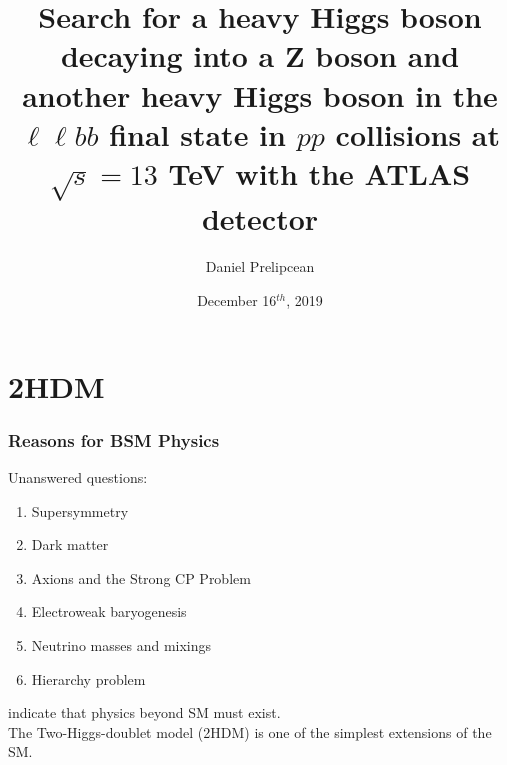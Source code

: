 \documentclass[10pt]{beamer} %
\title[Search for a heavy Higgs boson decay $A \to ZH \to  \ell\ell bb$ final state in $pp$ collisions at $\sqrt{s} = 13$ TeV with the ATLAS detector]{Search for a heavy Higgs boson decaying into a Z boson and another heavy Higgs boson in the $\ell\ell bb$ final state in $pp$ collisions at $\sqrt{s} = 13$ TeV with the ATLAS detector} %
\author[Daniel Prelipcean]{Daniel Prelipcean} %
\institute[Physics at LHC - Advanced Seminar] %
{Technical University of Munich\\Physics at LHC - Advanced Seminar}
\date{December 16$^{th}$, 2019} %
\begin{document}
\begin{frame}
\titlepage %

\end{frame}







\section{2HDM}

\begin{frame}
\frametitle{Reasons for BSM Physics}
Unanswered questions:
\begin{enumerate}
    \item Supersymmetry
    \item Dark matter
    \item Axions and the Strong CP Problem
    \item Electroweak baryogenesis
    \item Neutrino masses and mixings
    \item Hierarchy problem
\end{enumerate}
indicate that physics beyond SM must exist. \\

The Two-Higgs-doublet model (2HDM) is one of the simplest extensions of the SM.

\end{frame}

\end{document}
